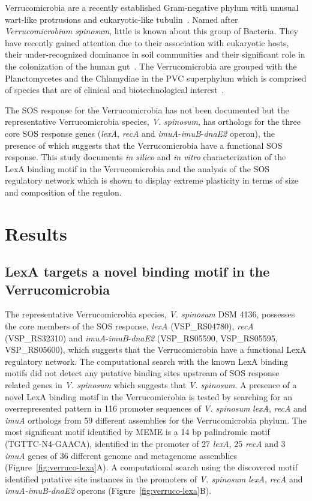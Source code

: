 Verrucomicrobia are a recently established Gram-negative phylum with unusual
wart-like protrusions and eukaryotic-like tubulin~\cite{garrity2001road,
  schlesner2006phylum}. Named after \textit{Verrucomicrobium spinosum}, little
is known about this group of Bacteria. They have recently gained attention due
to their association with eukaryotic hosts, their under-recognized dominance in
soil communities and their significant role in the colonization of the human
gut~\cite{sait2011genomic, bergmann2011under, dubourg2013high}. The
Verrucomicrobia are grouped with the Planctomycetes and the Chlamydiae in the
PVC superphylum which is comprised of species that are of clinical and
biotechnological interest~\cite{gupta2012molecular}.


The SOS response for the Verrucomicrobia has not been documented but the
representative Verrucomicrobia species, \textit{V. spinosum}, has orthologs for
the three core SOS response genes (\textit{lexA}, \textit{recA} and
\textit{imuA}-\textit{imuB}-\textit{dnaE2} operon), the presence of which
suggests that the Verrucomicrobia have a functional SOS response. This study
documents \textit{in silico} and \textit{in vitro} characterization of the LexA
binding motif in the Verrucomicrobia and the analysis of the SOS regulatory
network which is shown to display extreme plasticity in terms of size and
composition of the regulon.

\section{Results}

\subsection{LexA targets a novel binding motif in the Verrucomicrobia}

The representative Verrucomicrobia species, \textit{V. spinosum} DSM 4136,
possesses the core members of the SOS response, \textit{lexA} (VSP\_RS04780),
\textit{recA} (VSP\_RS32310) and \textit{imuA}-\textit{imuB}-\textit{dnaE2}
(VSP\_RS05590, VSP\_RS05595, VSP\_RS05600), which suggests that the
Verrucomicrobia have a functional LexA regulatory network. The computational
search with the known LexA binding motifs did not detect any putative binding
sites upstream of SOS response related genes in \textit{V. spinosum} which
suggests that \textit{V. spinosum}. A presence of a novel LexA binding motif in
the Verrucomicrobia is tested by searching for an overrepresented pattern in
116 promoter sequences of \textit{V. spinosum} \textit{lexA}, \textit{recA} and
\textit{imuA} orthologs from 59 different assemblies for the Verrucomicrobia
phylum. The most significant motif identified by MEME is a 14 bp palindromic
motif (TGTTC-N4-GAACA), identified in the promoter of 27 \textit{lexA}, 25
\textit{recA} and 3 \textit{imuA} genes of 36 different genome and metagenome
assemblies (Figure~\ref{fig:verruco-lexa}A). A computational search using the
discovered motif identified putative site instances in the promoters of
\textit{V. spinosum} \textit{lexA}, \textit{recA} and \textit{imuA-imuB-dnaE2}
operons (Figure~\ref{fig:verruco-lexa}B).


